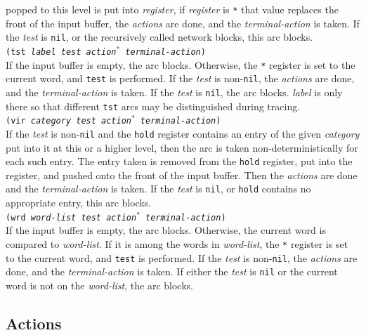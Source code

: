 \documentclass{book}
\begin{document}
popped to this level is put into {\it register}, if {\it register} is \verb|*| that value replaces the
front of the input buffer, the {\it actions} are done, and the {\it terminal-action} is taken.  If the {\it
test} is {\tt nil}, or the recursively called network blocks, this arc blocks.  \\[2ex]
{\tt (tst {\it label test action$^*$ terminal-action})} \\
If the input buffer is empty, the arc blocks.  Otherwise, the \verb|*| register is set to the current word,
and {\tt test} is performed.  If the {\it test} is non-{\tt nil}, the {\it actions} are done, and the {\it
terminal-action} is taken.  If the {\it test} is {\tt nil}, the arc blocks.  {\it label} is only there so
that different {\tt tst} arcs may be distinguished during tracing.  \\[2ex]
{\tt (vir {\it category test action$^*$ terminal-action})} \\ 
If the {\it test} is non-{\tt nil} and the {\tt hold} register contains an entry of the given {\it category}
put into it at this or a higher level, then the arc is taken non-deterministically for each such entry.  The
entry taken is removed from the {\tt hold} register, put into the {\tt *} register, and pushed onto the front
of the input buffer.  Then the {\it actions} are done and the {\it terminal-action} is taken.  If the {\it
test} is {\tt nil}, or {\tt hold} contains no appropriate entry, this arc blocks.  \\[2ex]
{\tt (wrd {\it word-list test action$^*$ terminal-action})} \\
If the input buffer is empty, the arc blocks.  Otherwise, the current word is compared to {\it word-list}.
If it is among the words in {\it word-list}, the \verb|*| register is set to the current word, and {\tt test}
is performed.  If the {\it test} is non-{\tt nil}, the {\it actions} are done, and the {\it terminal-action}
is taken.  If either the {\it test} is {\tt nil} or the current word is not on the {\it word-list}, the arc
blocks.

\subsection{Actions}
\end{document}
